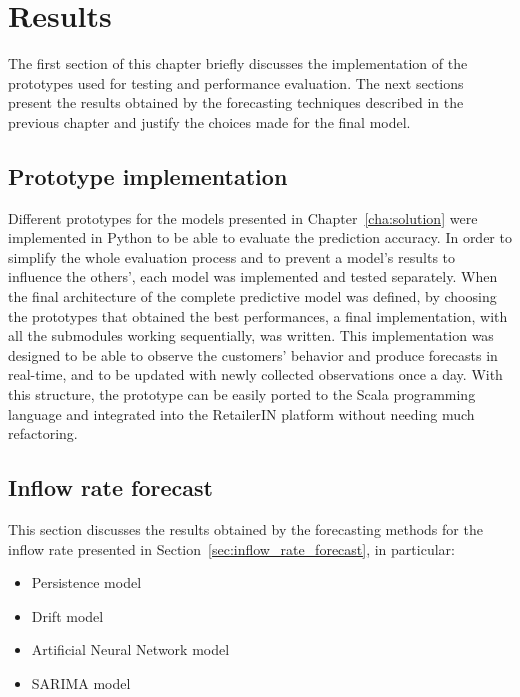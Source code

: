 \chapter{Results}
\label{cha:results}

The first section of this chapter briefly discusses the implementation of the prototypes used for testing and performance evaluation. The next sections present the results obtained by the forecasting techniques described in the previous chapter and justify the choices made for the final model.

\section{Prototype implementation}
\label{sec:prototype_implementation}

Different prototypes for the models presented in Chapter~\ref{cha:solution} were implemented in Python to be able to evaluate the prediction accuracy. In order to simplify the whole evaluation process and to prevent a model's results to influence the others', each model was implemented and tested separately. When the final architecture of the complete predictive model was defined, by choosing the prototypes that obtained the best performances, a final implementation, with all the submodules working sequentially, was written. This implementation was designed to be able to observe the customers' behavior and produce forecasts in real-time, and to be updated with newly collected observations once a day. With this structure, the prototype can be easily ported to the Scala programming language and integrated into the RetailerIN platform without needing much refactoring.

\section{Inflow rate forecast}
\label{sec:inflow_rate_forecast_results}

This section discusses the results obtained by the forecasting methods for the inflow rate presented in Section~\ref{sec:inflow_rate_forecast}, in particular:
\begin{itemize}
  \item Persistence model
  \item Drift model
  \item Artificial Neural Network model
  \item SARIMA model
\end{itemize}

